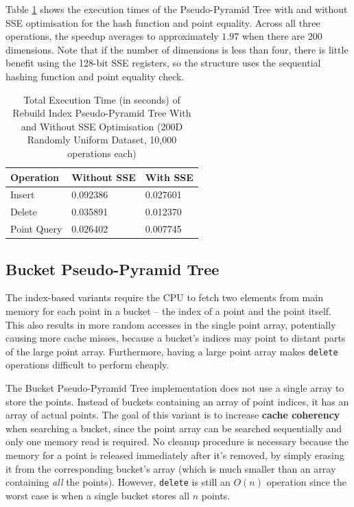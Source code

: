 Table \ref{tab:pseudo-pyramid-sse} shows the execution times of the Pseudo-Pyramid Tree with and without SSE optimisation for the hash function and point equality. Across all three operations, the speedup averages to approximately $1.97$ when there are 200 dimensions. Note that if the number of dimensions is less than four, there is little benefit using the 128-bit SSE registers, so the structure uses the sequential hashing function and point equality check.

\begin{table}
	\centering
	\begin{tabular}{|l|l|l|}
		\hline
		\textbf{Operation} & \textbf{Without SSE} & \textbf{With SSE} \\
		\hline
		Insert & 0.092386 & 0.027601 \\
		Delete & 0.035891 & 0.012370 \\
		Point Query & 0.026402 & 0.007745 \\
		\hline
	\end{tabular}
	\caption{Total Execution Time (in seconds) of Rebuild Index Pseudo-Pyramid Tree With and Without SSE Optimisation (200D Randomly Uniform Dataset, 10,000 operations each)}
	\label{tab:pseudo-pyramid-sse}
\end{table}

\subsection{Bucket Pseudo-Pyramid Tree}

The index-based variants require the CPU to fetch two elements from main memory for each point in a bucket -- the index of a point and the point itself. This also results in more random accesses in the single point array, potentially causing more cache misses, because a bucket's indices may point to distant parts of the large point array. Furthermore, having a large point array makes \texttt{delete} operations difficult to perform cheaply.

The Bucket Pseudo-Pyramid Tree implementation does not use a single array to store the points. Instead of buckets containing an array of point indices, it has an array of actual points. The goal of this variant is to increase \textbf{cache coherency} when searching a bucket, since the point array can be searched sequentially and only one memory read is required. No cleanup procedure is necessary because the memory for a point is released immediately after it's removed, by simply erasing it from the corresponding bucket's array (which is much smaller than an array containing \textit{all} the points). However, \texttt{delete} is still an $O(n)$ operation since the worst case is when a single bucket stores all $n$ points.

